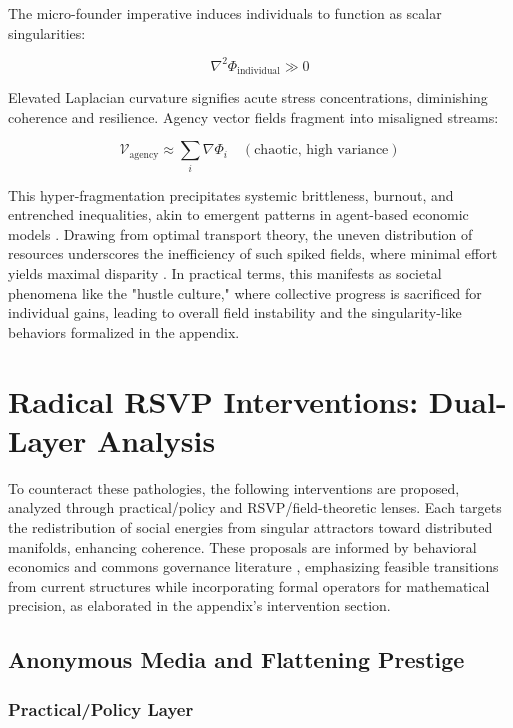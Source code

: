 \documentclass[11pt]{article}
\begin{document}
The micro-founder imperative induces individuals to function as scalar singularities:

\begin{equation}
\nabla^2 \Phi_{\text{individual}} \gg 0
\end{equation}

Elevated Laplacian curvature signifies acute stress concentrations, diminishing coherence and resilience. Agency vector fields fragment into misaligned streams:

\begin{equation}
\mathcal{V}_{\text{agency}} \approx \sum_i \nabla \Phi_i \quad (\text{chaotic, high variance})
\end{equation}

This hyper-fragmentation precipitates systemic brittleness, burnout, and entrenched inequalities, akin to emergent patterns in agent-based economic models \citep{carney2015emergent}. Drawing from optimal transport theory, the uneven distribution of resources underscores the inefficiency of such spiked fields, where minimal effort yields maximal disparity \citep{villani2009optimal}. In practical terms, this manifests as societal phenomena like the "hustle culture," where collective progress is sacrificed for individual gains, leading to overall field instability and the singularity-like behaviors formalized in the appendix.

\section{Radical RSVP Interventions: Dual-Layer Analysis}

To counteract these pathologies, the following interventions are proposed, analyzed through practical/policy and RSVP/field-theoretic lenses. Each targets the redistribution of social energies from singular attractors toward distributed manifolds, enhancing coherence. These proposals are informed by behavioral economics and commons governance literature \citep{sunstein2008nudge, ostrom1990governing}, emphasizing feasible transitions from current structures while incorporating formal operators for mathematical precision, as elaborated in the appendix's intervention section.

\subsection{Anonymous Media and Flattening Prestige}

\subsubsection{Practical/Policy Layer}
\end{document}
